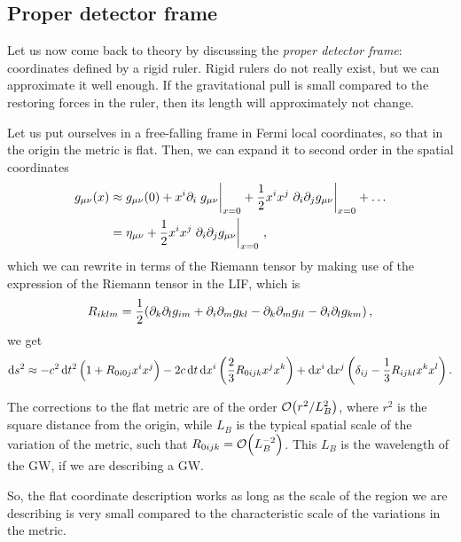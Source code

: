 \documentclass[main.tex]{subfiles}
\begin{document}
\subsection{Proper detector frame}

Let us now come back to theory by discussing the \emph{proper detector frame}: coordinates defined by a rigid ruler. 
Rigid rulers do not really exist, but we can approximate it well enough. If the gravitational pull is small compared to the restoring forces in the ruler, then its length will approximately not change. 

Let us put ourselves in a free-falling frame in Fermi local coordinates, so that in the origin the metric is flat.
Then, we can expand it to second order in the spatial coordinates 
%
\begin{subequations}
\begin{align}
g_{\mu \nu } (x) &\approx g_{\mu \nu } (0)
+ x^{i} \partial_{i} \eval{g_{\mu \nu }}_{x=0} 
+ \frac{1}{2} x^{i} x^{j} \eval{\partial_{i} \partial_{j} g_{\mu \nu }}_{x=0} + \dots  \\
&= \eta_{\mu \nu } + \frac{1}{2} x^{i} x^{j} \eval{\partial_{i} \partial_{j} g_{\mu \nu }}_{x=0}
\,,
\end{align}
\end{subequations}
%
which we can rewrite in terms of the Riemann tensor by making use of the expression of the Riemann tensor in the LIF, which is 
%
\begin{align}
R_{iklm} = \frac{1}{2} \qty(
  \partial_{k} \partial_{l} g_{im} +
  \partial_{i} \partial_{m} g_{kl} -
  \partial_{k} \partial_{m} g_{il} -
  \partial_{i} \partial_{l} g_{km}  
)
\,,
\end{align}
%
we get 
%
\begin{align}
\dd{s^2} \approx - c^2 \dd{t^2} \qty(1 + R_{0i0j} x^{i}x^{j})
-2 c \dd{t} \dd{x^{i}} \qty(\frac{2}{3}R_{0ijk} x^{j}x^{k})
+ \dd{x^{i}} \dd{x^{j}} \qty(\delta_{ij} - \frac{1}{3} R_{ijkl} x^{k} x^{l})
\,.
\end{align}

The corrections to the flat metric are of the order \(\order{r^2 / L_B^2}\), where \(r^2\) is the square distance from the origin, while \(L_B\) is the typical spatial scale of the variation of the metric, such that \(R_{0ijk} = \order{L_B^{-2}}\). 
This \(L_B\) is the wavelength of the GW, if we are describing a GW.

So, the flat coordinate description works as long as the scale of the region we are describing is very small compared to the characteristic scale of the variations in the metric. 
\end{document}
